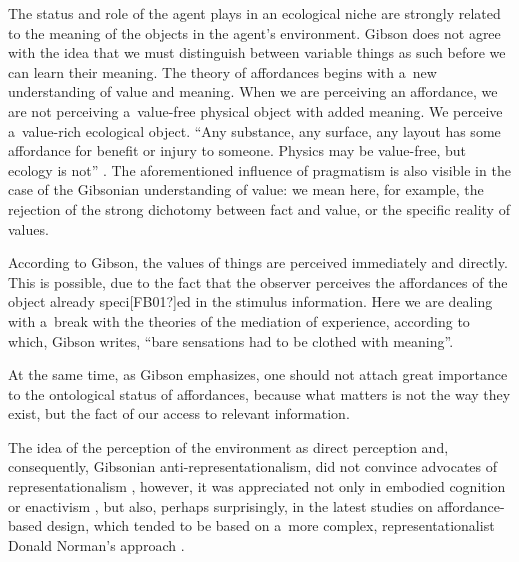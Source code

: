 \documentclass[%
manuscript=article,
year=2024,
volume=77,
doi=00000.000,
]{zfn}
\begin{document}
The status and role of the agent plays in an ecological niche are strongly related to the meaning of the objects in the agent's environment. Gibson does not agree with the idea that we must distinguish between variable things as such before we can learn their meaning. The theory of affordances begins with a~new understanding of value and meaning. When we are perceiving an affordance, we are not perceiving a~value-free physical object with added meaning. We perceive a~value-rich ecological object. ``Any substance, any surface, any layout has some affordance for benefit or injury to someone. Physics may be value-free, but ecology is not'' 
\parencite[][p.140]{gibson_ecological_1979}. %
 The aforementioned influence of pragmatism is also visible in the case of the Gibsonian understanding of value: we mean here, for example, the rejection of the strong dichotomy between fact and value, or the specific reality of values.



According to Gibson, the values of things are perceived immediately and directly. This is possible, due to the fact that the observer perceives the affordances of the object already speci[FB01?]ed in the stimulus information. Here we are dealing with a~break with the theories of the mediation of experience, according to which, Gibson 
\parencite*[][p.140]{gibson_ecological_1979} %
 writes, ``bare sensations had to be clothed with meaning''.



At the same time, as Gibson emphasizes, one should not attach great importance to the ontological status of affordances, because what matters is not the way they exist, but the fact of our access to relevant information.



The idea of the perception of the environment as direct perception and, consequently, Gibsonian anti-representationalism, did not convince advocates of representationalism 
\parencite[e.g.,][]{fodor_how_1981}, %
 however, it was appreciated not only in embodied cognition or enactivism 
\parencite[][]{herasescribano_philosophy_2019}, %
 but also, perhaps surprisingly, in the latest studies on affordance-based design, which tended to be based on a~more complex, representationalist Donald Norman's approach 
\parencite[see][]{masoudi_review_2019}.%
\end{document}
